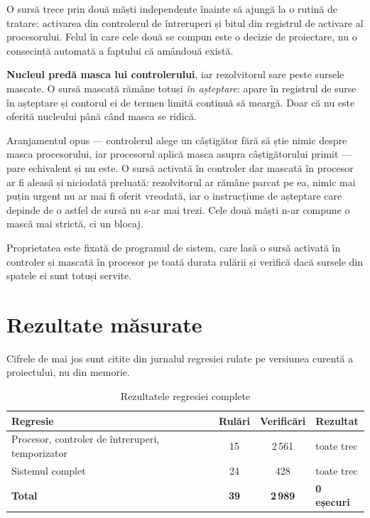 \documentclass[11pt,openany]{report}
\begin{document}
O sursă trece prin două măști independente înainte să ajungă la o rutină de
tratare: activarea din controlerul de întreruperi și bitul din registrul de
activare al procesorului. Felul în care cele două se compun este o decizie de
proiectare, nu o consecință automată a faptului că amândouă există.

\textbf{Nucleul predă masca lui controlerului}, iar rezolvitorul sare peste
sursele mascate. O sursă mascată rămâne totuși \emph{în așteptare}: apare în
registrul de surse în așteptare și contorul ei de termen limită continuă să
meargă. Doar că nu este oferită nucleului până când masca se ridică.

Aranjamentul opus --- controlerul alege un câștigător fără să știe nimic despre
masca procesorului, iar procesorul aplică masca asupra câștigătorului primit ---
pare echivalent și nu este. O sursă activată în controler dar mascată în
procesor ar fi aleasă și niciodată preluată: rezolvitorul ar rămâne parcat pe ea,
nimic mai puțin urgent nu ar mai fi oferit vreodată, iar o instrucțiune de
așteptare care depinde de o astfel de sursă nu s-ar mai trezi. Cele două măști
n-ar compune o mască mai strictă, ci un blocaj.

Proprietatea este fixată de programul de sistem, care lasă o sursă activată în
controler și mascată în procesor pe toată durata rulării și verifică dacă
sursele din spatele ei sunt totuși servite.

\section{Rezultate măsurate}

Cifrele de mai jos sunt citite din jurnalul regresiei rulate pe versiunea
curentă a proiectului, nu din memorie.

\begin{table}[H]
\centering
\caption{Rezultatele regresiei complete}
\label{tab:rezultate}
\small
\begin{tabular}{@{}lccl@{}}
\toprule
\textbf{Regresie} & \textbf{Rulări} & \textbf{Verificări} & \textbf{Rezultat} \\
\midrule
Procesor, controler de întreruperi, temporizator & 15 & 2\,561 & toate trec \\
Sistemul complet & 24 & 428 & toate trec \\
\midrule
\textbf{Total} & \textbf{39} & \textbf{2\,989} & \textbf{0 eșecuri} \\
\bottomrule
\end{tabular}
\end{table}
\end{document}
